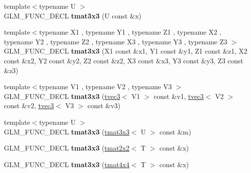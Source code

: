 \begin{DoxyCompactItemize}
\item 
\hypertarget{structglm_1_1detail_1_1tmat3x3_aa670b7140f58c3b1dfcc51c20b4fb2cd}{}{\footnotesize template$<$typename U $>$ }\\G\+L\+M\+\_\+\+F\+U\+N\+C\+\_\+\+D\+E\+C\+L {\bfseries tmat3x3} (U const \&x)\label{structglm_1_1detail_1_1tmat3x3_aa670b7140f58c3b1dfcc51c20b4fb2cd}

\item 
\hypertarget{structglm_1_1detail_1_1tmat3x3_ab0425c74c37b23c53fe07ed3d4487612}{}{\footnotesize template$<$typename X1 , typename Y1 , typename Z1 , typename X2 , typename Y2 , typename Z2 , typename X3 , typename Y3 , typename Z3 $>$ }\\G\+L\+M\+\_\+\+F\+U\+N\+C\+\_\+\+D\+E\+C\+L {\bfseries tmat3x3} (X1 const \&x1, Y1 const \&y1, Z1 const \&z1, X2 const \&x2, Y2 const \&y2, Z2 const \&z2, X3 const \&x3, Y3 const \&y3, Z3 const \&z3)\label{structglm_1_1detail_1_1tmat3x3_ab0425c74c37b23c53fe07ed3d4487612}

\item 
\hypertarget{structglm_1_1detail_1_1tmat3x3_a787532b9eb870c1b0f2d7ba56bc93d63}{}{\footnotesize template$<$typename V1 , typename V2 , typename V3 $>$ }\\G\+L\+M\+\_\+\+F\+U\+N\+C\+\_\+\+D\+E\+C\+L {\bfseries tmat3x3} (\hyperlink{structglm_1_1detail_1_1tvec3}{tvec3}$<$ V1 $>$ const \&v1, \hyperlink{structglm_1_1detail_1_1tvec3}{tvec3}$<$ V2 $>$ const \&v2, \hyperlink{structglm_1_1detail_1_1tvec3}{tvec3}$<$ V3 $>$ const \&v3)\label{structglm_1_1detail_1_1tmat3x3_a787532b9eb870c1b0f2d7ba56bc93d63}

\item 
\hypertarget{structglm_1_1detail_1_1tmat3x3_a1ebfe525d241841e712ce78807f8860d}{}{\footnotesize template$<$typename U $>$ }\\G\+L\+M\+\_\+\+F\+U\+N\+C\+\_\+\+D\+E\+C\+L {\bfseries tmat3x3} (\hyperlink{structglm_1_1detail_1_1tmat3x3}{tmat3x3}$<$ U $>$ const \&m)\label{structglm_1_1detail_1_1tmat3x3_a1ebfe525d241841e712ce78807f8860d}

\item 
\hypertarget{structglm_1_1detail_1_1tmat3x3_af32cfbe6209897b6021190d717ff0097}{}G\+L\+M\+\_\+\+F\+U\+N\+C\+\_\+\+D\+E\+C\+L {\bfseries tmat3x3} (\hyperlink{structglm_1_1detail_1_1tmat2x2}{tmat2x2}$<$ T $>$ const \&x)\label{structglm_1_1detail_1_1tmat3x3_af32cfbe6209897b6021190d717ff0097}

\item 
\hypertarget{structglm_1_1detail_1_1tmat3x3_a92e0e3bb09b8472e41f4ede37067bd22}{}G\+L\+M\+\_\+\+F\+U\+N\+C\+\_\+\+D\+E\+C\+L {\bfseries tmat3x3} (\hyperlink{structglm_1_1detail_1_1tmat4x4}{tmat4x4}$<$ T $>$ const \&x)\label{structglm_1_1detail_1_1tmat3x3_a92e0e3bb09b8472e41f4ede37067bd22}


\end{DoxyCompactItemize}
